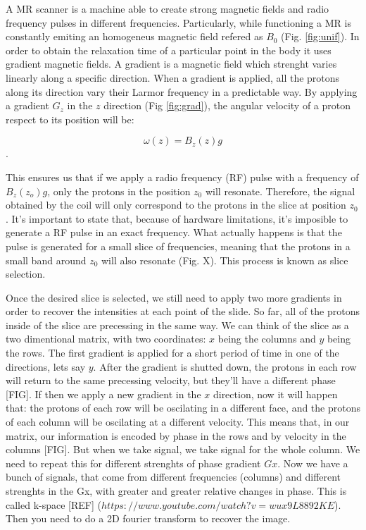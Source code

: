 A MR scanner is a machine able to create strong magnetic fields and radio frequency pulses in different frequencies.
Particularly, while functioning a MR is constantly emiting an homogeneus magnetic field refered as $B_0$ (Fig. \ref{fig:unif}).
In order to obtain the relaxation time of a particular point in the body it uses gradient magnetic fields.
A gradient is a magnetic field which strenght varies linearly along a specific direction.
When a gradient is applied, all the protons along its direction vary their Larmor frequency in a predictable way.
By applying a gradient $G_z$ in the $z$ direction (Fig \ref{fig:grad}), the angular velocity of a proton respect to its position will be:

$$\omega(z) = B_z(z) g$$.

This ensures us that if we apply a radio frequency (RF) pulse with a frequency of $B_z(z_o) g$, only the protons in the position $z_0$ will resonate.
Therefore, the signal obtained by the coil will only correspond to the protons in the slice at position $z_0$.
It's important to state that, because of hardware limitations, it's imposible to generate a RF pulse in an exact frequency.
What actually happens is that the pulse is generated for a small slice of frequencies, meaning that the protons in a small band around $z_0$ will also resonate (Fig. X).
This process is known as slice selection.


Once the desired slice is selected, we still need to apply two more gradients in order to recover the intensities at each point of the slide.
So far, all of the protons inside of the slice are precessing in the same way.
We can think of the slice as a two dimentional matrix, with two coordinates: $x$ being the columns and $y$ being the rows.
The first gradient is applied for a short period of time in one of the directions, lets say $y$.
After the gradient is shutted down, the protons in each row will return to the same precessing velocity, but they'll have a different phase [FIG].
If then we apply a new gradient in the $x$ direction, now it will happen that:
the protons of each row will be oscilating in a different face,
and the protons of each column will be oscilating at a different velocity.
This means that, in our matrix, our information is encoded by phase in the rows and by velocity in the columns [FIG].
But when we take signal, we take signal for the whole column.
We need to repeat this for different strenghts of phase gradient $Gx$.
Now we have a bunch of signals, that come from different frequencies (columns) and different strenghts in the Gx, with greater and greater relative changes in phase.
This is called k-space [REF] ($https://www.youtube.com/watch?v=wux9L8892KE$).
Then you need to do a 2D fourier transform to recover the image.

